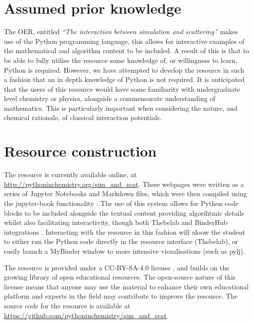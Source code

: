 \documentclass[amsmath,amssymb,twocolumn,superscriptaddress]{revtex4-1}
\begin{document}
\section{Assumed prior knowledge}

The OER, entitled \emph{``The interaction between simulation and scattering''} makes use of the Python programming language, this allows for interactive examples of the mathematical and algorithm content to be included.
A result of this is that to be able to fully utilise the resource some knowledge of, or willingness to learn, Python is required.
However, we have attempted to develop the resource in such a fashion that an in depth knowledge of Python is not required.
It is anticipated that the users of this resource would have some familiarity with undergraduate level chemistry or physics, alongside a commensurate understanding of mathematics.
This is particularly important when considering the nature, and chemical rationale, of classical interaction potentials.

\section{Resource construction}

The resource is currently available online, at \url{http://pythoninchemistry.org/sim_and_scat}.
These webpages were written as a series of Jupyter Notebooks and Markdown files, which were then compiled using the jupyter-book functionality \cite{lau_jupyter/jupyter-book_2019}.
The use of this system allows for Python code blocks to be included alongside the textual content providing algorihtmic details whilst also facilitating interactivity, though both Thebelab and BinderHub integrations \cite{ragan-kelley_minrk/thebelab_2019,ragan-kelley_jupyterhub/binderhub_2019,jupyter_binder_2018}.
Interacting with the resource in this fashion will aloow the student to either run the Python code directly in the resource interface (Thebelab), or easily launch a MyBinder window to more intensive visualisations (such as pylj).

The resource is provided under a CC-BY-SA-4.0 license \cite{noauthor_creative_2019}, and builds on the growing library of open educational resources.
The open-source nature of this license means that anyone may use the material to enhance their own educational platform and experts in the field may contribute to improve the resource.
The source code for the resource is available at \url{https://github.com/pythoninchemistry/sim_and_scat}.
\end{document}
